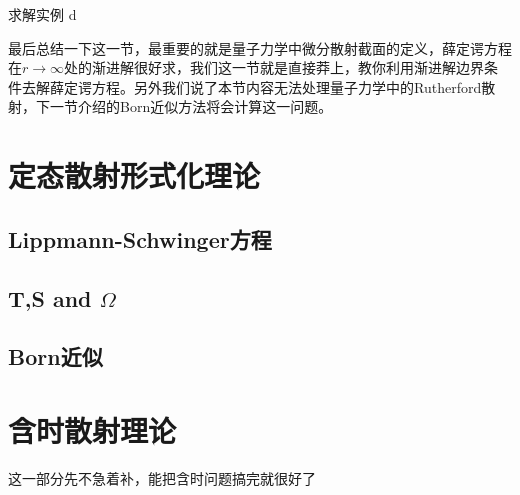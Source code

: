 \documentclass[a4paper,zihao=-4,linespread=1]{ctexrep}
\begin{document}
	\begin{example}{求解实例}
		d
	\end{example}
	
	最后总结一下这一节，最重要的就是量子力学中微分散射截面的定义，薛定谔方程在$r\to\infty$处的渐进解很好求，我们这一节就是直接莽上，教你利用渐进解边界条件去解薛定谔方程。另外我们说了本节内容无法处理量子力学中的Rutherford散射，下一节介绍的Born近似方法将会计算这一问题。
	
	\section{定态散射形式化理论}
	\subsection{Lippmann-Schwinger方程}
	
	\subsection{T,S and $\Omega$}
	
	\subsection{Born近似}
	
	\section{含时散射理论}
	这一部分先不急着补，能把含时问题搞完就很好了
	
     
    
\end{document}
